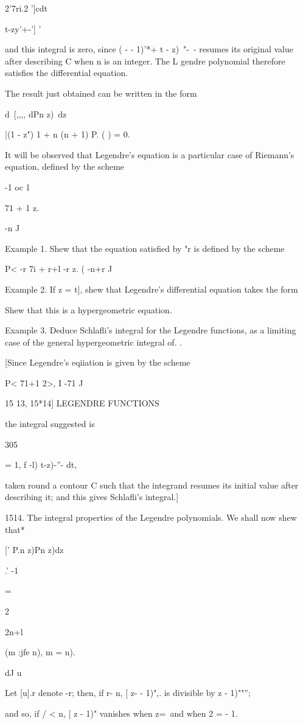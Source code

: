   2'7ri.2 ']cdt\ \ {t-zy'+-'] '

and this integral is zero, since ( - - 1)'*+ t - z)~"-~- resumes its
original value after describing C when n is an integer. The L gendre
polynomial therefore satisfies the differential equation.

The result just obtained can be written in the form

d\ [,,,, dPn z)\ dz

|(1 - z") 1 + n (n + 1) P. ( ) = 0.

It will be observed that Legendre's equation is a particular case of
Riemann's equation, defined by the scheme

-1 oc 1

71 + 1 z.

-n J

Example 1. Shew that the equation satisfied by "r is defined by the
scheme

P< -r 7i + r+l -r z. ( -n+r J

Example 2. If z = t], shew that Legendre's differential equation takes
the form

Shew that this is a hypergeometric equation.

Example 3. Deduce Schlafli's integral for the Legendre functions, as a
limiting case of the general hypergeometric integral of. .

[Since Legendre's eqiiation is given by the scheme

P< 71+1 2>, I -71 J

15 13, 15*14] LEGENDRE FUNCTIONS

the integral suggested is

305

= 1, f -l) t-z)-''- dt,

taken round a contour C such that the integrand resumes its initial
value after describing it; and this gives Schlafli's integral.]

1514. The integral properties of the Legendre polynomials. We shall
now shew that*

[' P.n z)Pn z)dz

.' -1

=

2

2n+l

(m :jfe n), m = n).

dJ u

Let [u].r denote -r; then, if r- n, [ z- - 1)",. is divisible by z -
1)""'';

and so, if / < n, [ z - 1)" vanishes when z=\ and when 2 = - 1.

}
